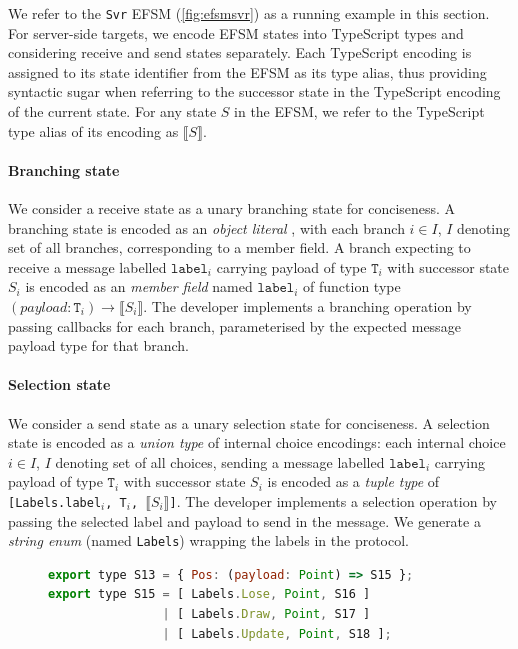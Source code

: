 We refer to the \texttt{Svr} EFSM (\cref{fig:efsmsvr}) as a running example in
this section.
For server-side targets, we encode EFSM states into TypeScript types and
considering receive and send states separately.
Each TypeScript encoding is assigned to its state identifier from the EFSM as
its type alias, thus providing syntactic sugar when referring to the successor
state in the TypeScript encoding of the current state.
For any state $S$ in the EFSM, we refer to the TypeScript type alias of its
encoding as $\llbracket S \rrbracket$.

\paragraph{Branching state}
We consider a receive state as a unary branching state for conciseness.
A branching state is encoded as an \textit{object literal}
\cite{TypeScriptSpec}, with each branch $i \in I$, $I$ denoting set of all
branches, corresponding to a member field.
A branch expecting to receive a message labelled $\texttt{label}_i$ carrying
payload of type $\texttt{T}_i$ with successor state $S_i$ is encoded as an
\textit{member field} named $\texttt{label}_i$ of function type
$(payload:\texttt{T}_i) \to \llbracket S_i \rrbracket$.
The developer implements a branching operation by passing callbacks for each
branch, parameterised by the expected message payload type for that branch.

\paragraph{Selection state}
We consider a send state as a unary selection state for conciseness.
A selection state is encoded as a \textit{union type}
\cite{TypeScriptSpec} of internal choice encodings: each internal choice $i \in
I$, $I$ denoting set of all choices, sending a message labelled
$\texttt{label}_i$ carrying payload of type $\texttt{T}_i$ with successor state
$S_i$ is encoded as a \textit{tuple type} of \texttt{[Labels.label$_i$, T$_i$,
  $\llbracket S_i \rrbracket$]}.
The developer implements a selection operation by passing the selected label
and payload to send in the message.
We generate a \textit{string enum} (named \texttt{Labels}) wrapping the labels
in the protocol.

\begin{figure}[ht]
\begin{lstlisting}[language=JavaScript]
export type S13 = { Pos: (payload: Point) => S15 };
export type S15 = [ Labels.Lose, Point, S16 ]
                | [ Labels.Draw, Point, S17 ]
                | [ Labels.Update, Point, S18 ];
\end{lstlisting}
\label{lst:svr}
\end{figure}

